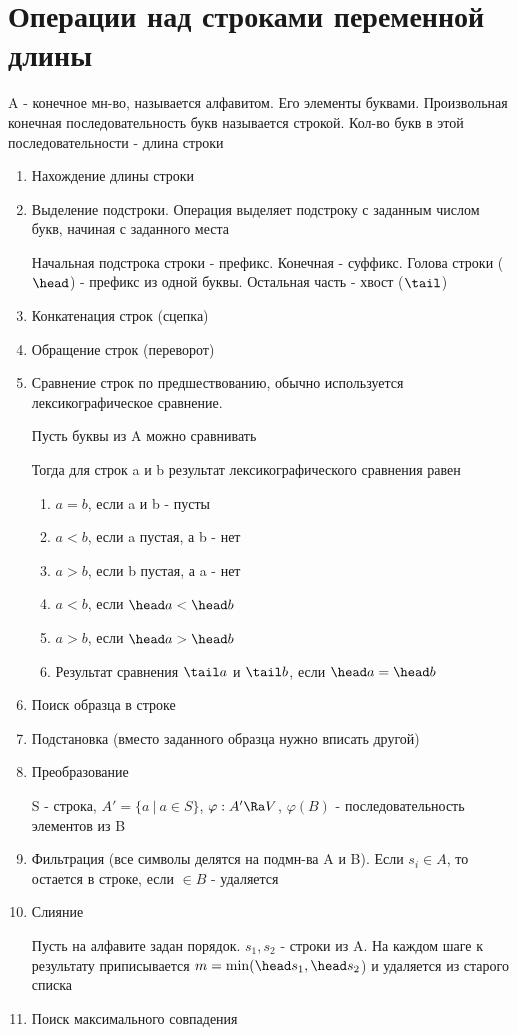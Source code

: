 \documentclass[discrete.tex]{subfiles}
\begin{document}
  \section{Операции над строками переменной длины}

  \begin{definition}
    A - конечное мн-во, называется алфавитом. Его элементы буквами. Произвольная конечная последовательность букв называется строкой. Кол-во букв в этой последовательности - длина строки
  \end{definition}

  \begin{enumerate}
    \item Нахождение длины строки
    \item Выделение подстроки. Операция выделяет подстроку с заданным числом букв, начиная с заданного места
    \begin{definition}
      Начальная подстрока строки - префикс. Конечная - суффикс. Голова строки ($\head$) - префикс из одной буквы. Остальная часть - хвост ($\tail$)
    \end{definition}
    \item Конкатенация строк (сцепка)
    \item Обращение строк (переворот)
    \item Сравнение строк по предшествованию, обычно используется лексикографическое сравнение.

    Пусть буквы из A можно сравнивать

    Тогда для строк a и b результат лексикографического сравнения равен
    \begin{enumerate}
      \item $a=b$, если a и b - пусты
      \item $a<b$, если a пустая, а b - нет
      \item $a>b$, если b пустая, а a - нет
      \item $a<b$, если $\head a < \head b$
      \item $a>b$, если $\head a > \head b$
      \item Результат сравнения $\tail a$ и $\tail b$, если $\head a = \head b$
    \end{enumerate}
    \item Поиск образца в строке
    \item Подстановка (вместо заданного образца нужно вписать другой)
    \item Преобразование

    S - строка, $A' = \{ a\ |\ a \in S\}$, \q $\varphi: A' \Ra V$, \q $\varphi(B)$ - последовательность элементов из B
    \item Фильтрация (все символы делятся на подмн-ва A и B). Если $s_i \in A$, то остается в строке, если $\in B$ - удаляется
    \item Слияние

    Пусть на алфавите задан порядок. $s_1, s_2$ - строки из A. На каждом шаге к результату приписывается $m = \min (\head s_1, \head s_2$) и удаляется из старого списка
    \item Поиск максимального совпадения
  \end{enumerate}
\end{document}
